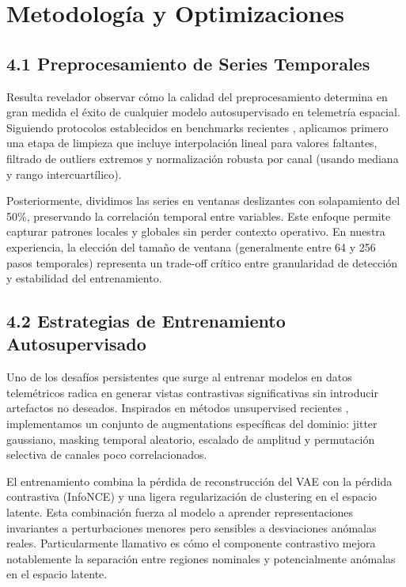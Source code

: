 \section{Metodología y Optimizaciones}

\subsection{4.1 Preprocesamiento de Series Temporales}

Resulta revelador observar cómo la calidad del preprocesamiento determina en gran medida el éxito de cualquier modelo autosupervisado en telemetría espacial. Siguiendo protocolos establecidos en benchmarks recientes \cite{Ruszczak2025_OPSSAT}, aplicamos primero una etapa de limpieza que incluye interpolación lineal para valores faltantes, filtrado de outliers extremos y normalización robusta por canal (usando mediana y rango intercuartílico).

Posteriormente, dividimos las series en ventanas deslizantes con solapamiento del 50\%, preservando la correlación temporal entre variables. Este enfoque permite capturar patrones locales y globales sin perder contexto operativo. En nuestra experiencia, la elección del tamaño de ventana (generalmente entre 64 y 256 pasos temporales) representa un trade-off crítico entre granularidad de detección y estabilidad del entrenamiento.

\subsection{4.2 Estrategias de Entrenamiento Autosupervisado}

Uno de los desafíos persistentes que surge al entrenar modelos en datos telemétricos radica en generar vistas contrastivas significativas sin introducir artefactos no deseados. Inspirados en métodos unsupervised recientes \cite{Djerida2025_FPMC}, implementamos un conjunto de augmentations específicas del dominio: jitter gaussiano, masking temporal aleatorio, escalado de amplitud y permutación selectiva de canales poco correlacionados.

El entrenamiento combina la pérdida de reconstrucción del VAE con la pérdida contrastiva (InfoNCE) y una ligera regularización de clustering en el espacio latente. Esta combinación fuerza al modelo a aprender representaciones invariantes a perturbaciones menores pero sensibles a desviaciones anómalas reales. Particularmente llamativo es cómo el componente contrastivo mejora notablemente la separación entre regiones nominales y potencialmente anómalas en el espacio latente.

